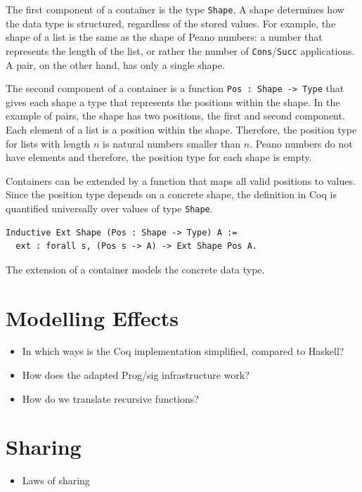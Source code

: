 \documentclass[a4paper, 11pt, fleqn, twoside]{scrreprt}
\begin{document}
The first component of a container is the type \texttt{Shape}. A 
shape determines how the data type is structured, regardless of the stored 
values. For example, the  shape of a list is the same as the shape of Peano 
numbers: a number that  represents the length of the list, or rather the number 
of \texttt{Cons}/\texttt{Succ} applications. A pair, 
on the other hand, has only a single shape.

The second component of a container is a function \texttt{Pos : Shape 
-> Type} that gives each shape a type that represents the positions within the 
shape. In the example of pairs, the shape has two positions, the first and 
second component. Each element of a list is a position within the shape. 
Therefore, the position type for lists with length $n$ is natural numbers 
smaller than $n$. Peano numbers do not have elements and therefore, the 
position type for each shape is empty.

Containers can be extended by a function that maps all valid positions to 
values. Since the position type depends on a concrete shape, the definition in 
Coq is quantified universally over values of type \texttt{Shape}.

\begin{verbatim}
Inductive Ext Shape (Pos : Shape -> Type) A := 
  ext : forall s, (Pos s -> A) -> Ext Shape Pos A.
\end{verbatim}

The extension of a container models the concrete data type.

\section{Modelling Effects}
\begin{itemize}
\item In which ways is the Coq implementation simplified, compared to Haskell?
\item How does the adapted Prog/sig infrastructure work?
\item How do we translate recursive functions?
\end{itemize}

\section{Sharing}
\begin{itemize}
\item Laws of sharing
\end{itemize}
\end{document}
